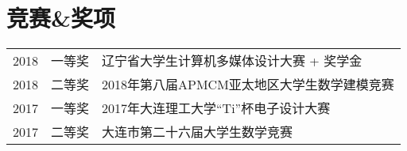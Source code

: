 \documentclass[]{deedy-resume-openfont}
\begin{document}
\begin{minipage}[t]{0.73\textwidth}

\section{竞赛\&奖项} 
\begin{tabular}{rll}
2018	     & 一等奖  & 辽宁省大学生计算机多媒体设计大赛 + 奖学金 \\
2018         & 二等奖  & 2018年第八届APMCM亚太地区大学生数学建模竞赛 \\
2017	     & 一等奖  & 2017年大连理工大学“Ti”杯电子设计大赛 \\
2017	     & 二等奖  & 大连市第二十六届大学生数学竞赛 \\
\end{tabular}
\sectionsep


% 
% 

\end{minipage} 
\end{document}
